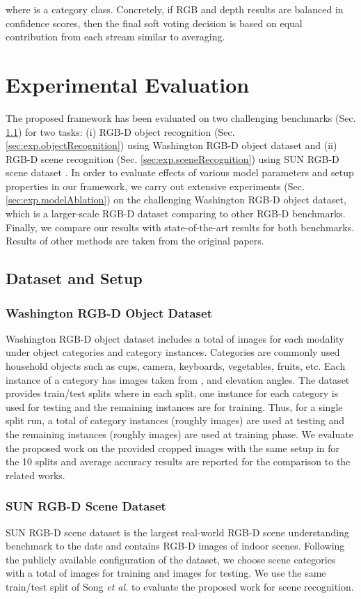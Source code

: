 \documentclass[10pt,journal,compsoc]{IEEEtran}
\begin{document}
where  is a category class. Concretely, if RGB and depth results are balanced in confidence scores, then the final soft voting decision is based on equal contribution from each stream similar to averaging. 

\section{Experimental Evaluation}
\label{sec:experiments}
The proposed framework has been evaluated on two challenging benchmarks (Sec. \ref{sec:exp.datasets}) for two tasks: (i) RGB-D object recognition (Sec. \ref{sec:exp.objectRecognition}) using Washington RGB-D object dataset \cite{Lai_ICRA_2011} and (ii) RGB-D scene recognition (Sec. \ref{sec:exp.sceneRecognition}) using SUN RGB-D scene dataset \cite{Song_CVPR_2015}. In order to evaluate effects of various model parameters and setup properties in our framework, we carry out extensive experiments (Sec. \ref{sec:exp.modelAblation}) on the challenging Washington RGB-D object dataset, which is a larger-scale RGB-D dataset comparing to other RGB-D benchmarks. Finally, we compare our results with state-of-the-art results for both benchmarks. Results of other methods are taken from
the original papers.

\subsection{Dataset and Setup} \label{sec:exp.datasets}
\subsubsection{Washington RGB-D Object Dataset}
Washington RGB-D object dataset includes a total of  images for each modality under  object categories and  category instances. Categories are commonly used household objects such as cups, camera, keyboards, vegetables, fruits, etc. Each instance of a category has images taken from ,  and  elevation angles. The dataset provides  train/test splits where in each split, one instance for each category is used for testing and the remaining instances are for training. Thus, for a single split run, a total of  category instances (roughly  images) are used at testing and the remaining  instances (roughly  images) are used at training phase. We evaluate the proposed work on the provided cropped images with the same setup in \cite{Lai_ICRA_2011} for the 10 splits and average accuracy results are reported for the comparison to the related works.
\subsubsection{SUN RGB-D Scene Dataset}
SUN RGB-D scene dataset is the largest real-world RGB-D scene understanding benchmark to the date and  contains RGB-D images of indoor scenes. Following the publicly available configuration of the dataset, we choose  scene categories with a total of  images for training and  images for testing. We use the same train/test split of Song \textit{et al.} \cite{Song_CVPR_2015} to evaluate the proposed work for scene recognition.
\end{document}
